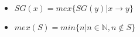 \begin{itemize}

\item $SG(x) = mex\{SG(y)|x\rightarrow y\}$
\item $mex(S) = min\{n|n\in\mathbb{N}, n\notin S\}$

\end{itemize}